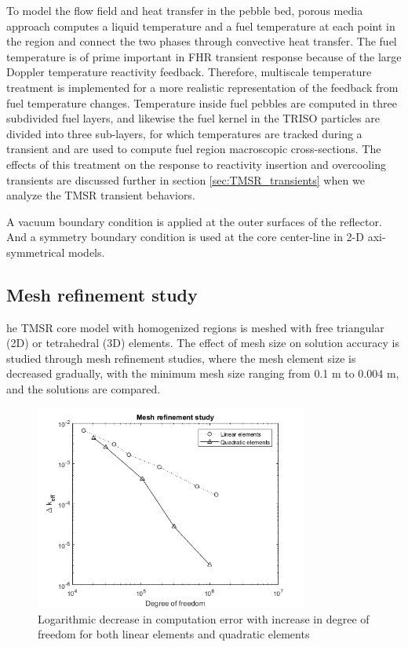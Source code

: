 \documentclass{elsarticle}
\begin{document}
To model the flow field and heat transfer in the pebble bed, porous media approach computes a liquid temperature and a fuel temperature at each point in the region and connect the two phases through convective heat transfer. The fuel temperature is of prime important in FHR transient response because of the large Doppler temperature reactivity feedback. Therefore, multiscale temperature treatment is implemented for a more realistic representation of the feedback from fuel temperature changes. 
Temperature inside fuel pebbles are computed in three subdivided fuel layers, and likewise the fuel kernel in the TRISO particles are divided into three sub-layers, for which temperatures are tracked during a transient and are used to compute fuel region macroscopic cross-sections. The effects of this treatment on the response to reactivity insertion and overcooling transients are discussed further in section \ref{sec:TMSR_transients} when we analyze the TMSR transient behaviors.



A vacuum boundary condition is applied at the outer surfaces of the reflector. And a symmetry boundary condition is used at the core center-line in 2-D axi-symmetrical models.

\subsection{Mesh refinement study}
he TMSR core model with homogenized regions is meshed with free triangular (2D) or tetrahedral (3D) elements. The effect of mesh size on solution accuracy is studied through mesh refinement studies, where the mesh element size is decreased gradually, with the minimum mesh size ranging from 0.1 m to 0.004 m, and the solutions are compared. 

\begin{figure}
\centering
    \includegraphics[width = 0.8\textwidth]{./images/diffusion/tmsr/mesh_refinement.png}  
    \caption{Logarithmic decrease in computation error with increase in degree of freedom for both linear elements and quadratic elements}
    \label{fig:mesh_refinement}
\end{figure}
\end{document}
